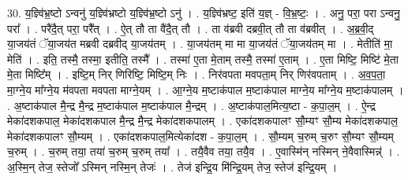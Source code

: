 \documentclass[17pt]{extarticle}
\begin{document}
30. य॒ज्ञ्वि॑भ्र॒ष्टो ऽन्वनु॑ य॒ज्ञ्वि॑भ्रष्टो य॒ज्ञ्वि॑भ्र॒ष्टो ऽनु॑ । . य॒ज्ञ्वि॑भ्रष्ट॒ इति॑ य॒ज्ञ् - वि॒भ्र॒ष्टः॒ । . अनु॒ परा॒ परा ऽन्वनु॒ परा᳚ । . परै॑दै॒त् परा॒ परै᳚त् । . ऐ॒त् तौ ता वै॑दै॒त् तौ । . ता व॑ब्रवी दब्रवी॒त् तौ ता व॑ब्रवीत् । . अ॒ब्र॒वी॒द् या॒जय॑तं ॅया॒जय॑त मब्रवी दब्रवीद् या॒जय॑तम् । . या॒जय॑तम् मा मा या॒जय॑तं ॅया॒जय॑तम् मा । . मेतीति॑ मा॒ मेति॑ । . इति॒ तस्मै॒ तस्मा॒ इतीति॒ तस्मै᳚ । . तस्मा॑ ए॒ता मे॒ताम् तस्मै॒ तस्मा॑ ए॒ताम् । . ए॒ता मिष्टि॒ मिष्टि॑ मे॒ता मे॒ता मिष्टि᳚म् । . इष्टि॒म् निर् णिरिष्टि॒ मिष्टि॒म् निः । . निर॑वपता मवपता॒म् निर् णिर॑वपताम् । . अ॒व॒प॒ता॒ मा॒ग्ने॒य मा᳚ग्ने॒य म॑वपता मवपता माग्ने॒यम् । . आ॒ग्ने॒य म॒ष्टाक॑पाल म॒ष्टाक॑पाल माग्ने॒य मा᳚ग्ने॒य म॒ष्टाक॑पालम् । . अ॒ष्टाक॑पाल मै॒न्द्र मै॒न्द्र म॒ष्टाक॑पाल म॒ष्टाक॑पाल मै॒न्द्रम् । . अ॒ष्टाक॑पाल॒मित्य॒ष्टा - क॒पा॒ल॒म् । . ऐ॒न्द्र मेका॑दशकपाल॒ मेका॑दशकपाल मै॒न्द्र मै॒न्द्र मेका॑दशकपालम् । . एका॑दशकपालꣳ सौ॒म्यꣳ सौ॒म्य मेका॑दशकपाल॒ मेका॑दशकपालꣳ सौ॒म्यम् । . एका॑दशकपाल॒मित्येका॑दश - क॒पा॒ल॒म् । . सौ॒म्यम् च॒रुम् च॒रुꣳ सौ॒म्यꣳ सौ॒म्यम् च॒रुम् । . च॒रुम् तया॒ तया॑ च॒रुम् च॒रुम् तया᳚ । . तयै॒वैव तया॒ तयै॒व । . ए॒वास्मि॑न् नस्मिन् ने॒वैवास्मिन्न्॑ । . अ॒स्मि॒न् तेज॒ स्तेजो᳚ ऽस्मिन् नस्मि॒न् तेजः॑ । . तेज॑ इन्द्रि॒य मि॑न्द्रि॒यम् तेज॒ स्तेज॑ इन्द्रि॒यम् । \newline
\end{document}
